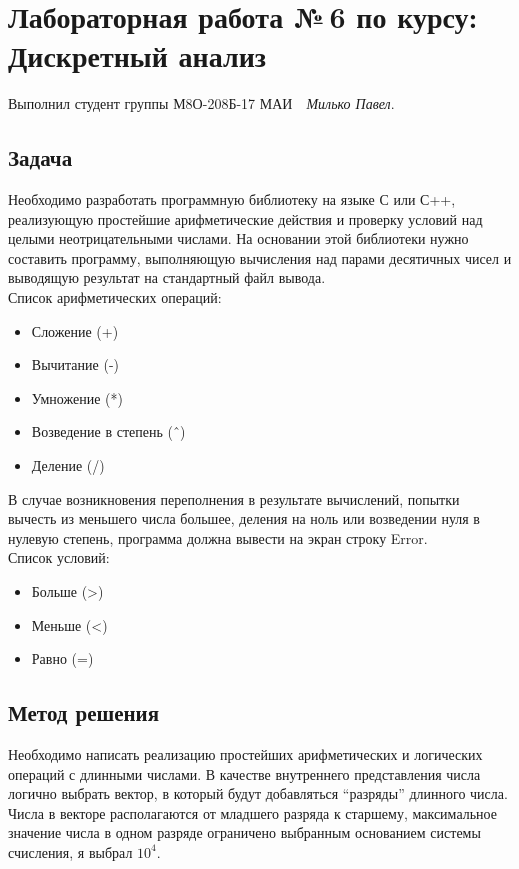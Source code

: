 \documentclass[12pt]{article}
\begin{document}
\section*{\centering Лабораторная работа №\,6 по курсу:\\ Дискретный анализ}

Выполнил студент группы М8О-208Б-17 МАИ \,\, \textit{Милько Павел}.

\subsection*{Задача}

\noindent Необходимо разработать программную библиотеку на языке С или
С++, реализующую простейшие арифметические действия и проверку условий над
целыми неотрицательными числами. На основании этой библиотеки нужно составить
программу, выполняющую вычисления над парами десятичных чисел и выводящую
результат на стандартный файл вывода.\\


Список арифметических операций:
\begin{itemize}
	\item Сложение (+)
	\item Вычитание (-)
	\item Умножение (*)
	\item Возведение в степень (ˆ)
	\item Деление (/)
\end{itemize}



В случае возникновения переполнения в результате вычислений, попытки вычесть из мень\-шего числа большее, деления на ноль или возведении нуля в нулевую степень, про\-грамма должна вывести на экран строку Error.\\

Список условий:
\begin{itemize}
\item Больше (>)
\item Меньше (<)
\item Равно (=)
\end{itemize}

\newpage

\subsection*{Метод решения}

Необходимо написать реализацию простейших арифметических и логических  операций с длинными числами. В качестве внутреннего представления числа логично выбрать вектор, в который будут добавляться ``разряды'' длинного числа. Числа в векторе располагаются от младшего разряда к старшему, максимальное значение числа в одном разряде ограничено выбранным основанием системы счисления, я выбрал $10^4$.
\end{document}
